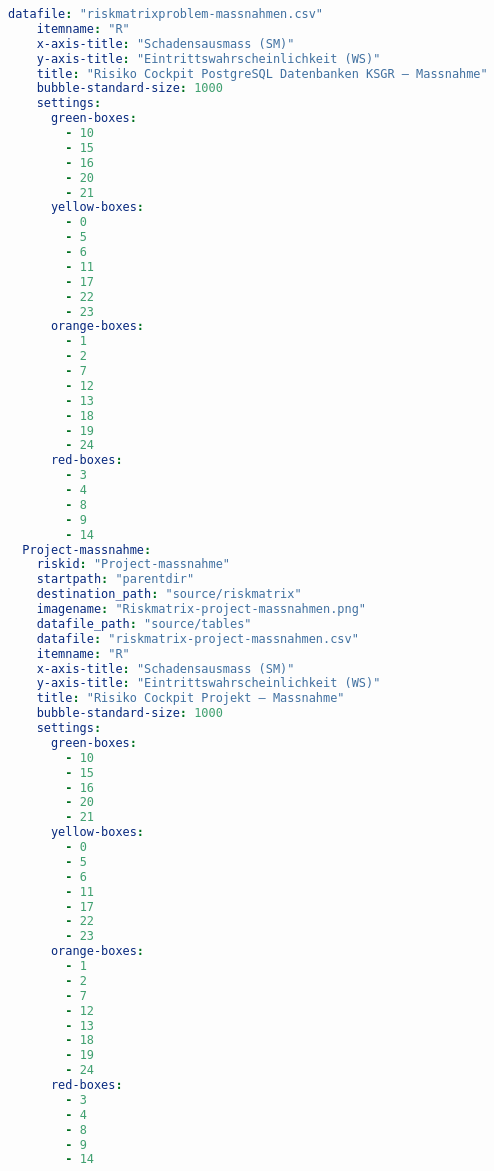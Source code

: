 \begin{lstlisting}[language=yaml, caption=Python LaTex - riskmatrix\_plotter\_conf.yaml - Konfigurationsdatei - Risxikomatrizen,captionpos=b,label={lst:riskmatrix_plotter_conf},breaklines=true]
    datafile: "riskmatrixproblem-massnahmen.csv"
    itemname: "R"
    x-axis-title: "Schadensausmass (SM)"
    y-axis-title: "Eintrittswahrscheinlichkeit (WS)"
    title: "Risiko Cockpit PostgreSQL Datenbanken KSGR – Massnahme"
    bubble-standard-size: 1000
    settings:
      green-boxes:
        - 10
        - 15
        - 16
        - 20
        - 21
      yellow-boxes:
        - 0
        - 5
        - 6
        - 11
        - 17
        - 22
        - 23
      orange-boxes:
        - 1
        - 2
        - 7
        - 12
        - 13
        - 18
        - 19
        - 24
      red-boxes:
        - 3
        - 4
        - 8
        - 9
        - 14
  Project-massnahme:
    riskid: "Project-massnahme"
    startpath: "parentdir"
    destination_path: "source/riskmatrix"
    imagename: "Riskmatrix-project-massnahmen.png"
    datafile_path: "source/tables"
    datafile: "riskmatrix-project-massnahmen.csv"
    itemname: "R"
    x-axis-title: "Schadensausmass (SM)"
    y-axis-title: "Eintrittswahrscheinlichkeit (WS)"
    title: "Risiko Cockpit Projekt – Massnahme"
    bubble-standard-size: 1000
    settings:
      green-boxes:
        - 10
        - 15
        - 16
        - 20
        - 21
      yellow-boxes:
        - 0
        - 5
        - 6
        - 11
        - 17
        - 22
        - 23
      orange-boxes:
        - 1
        - 2
        - 7
        - 12
        - 13
        - 18
        - 19
        - 24
      red-boxes:
        - 3
        - 4
        - 8
        - 9
        - 14
\end{lstlisting}